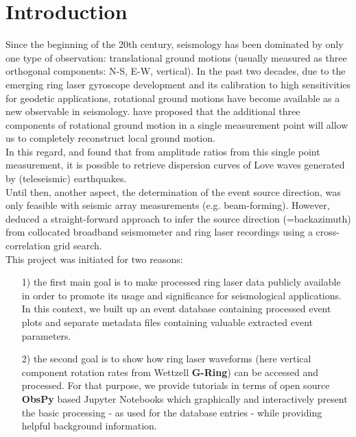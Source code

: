 \documentclass[12pt,reqno,letter]{article} %
\begin{document}
\section{Introduction}
Since the beginning of the 20th century, seismology has been dominated by only one type of observation: translational ground motions (usually measured as three orthogonal components: N-S, E-W, vertical). In the past two decades, due to the emerging ring laser gyroscope development and its calibration to high sensitivities \citep{Stedman1995,Stedman1997,Schreiber2003, Schreiber2004} for geodetic applications, rotational ground motions have become available as a new observable in seismology. \cite{AkiRichards2002} have proposed that the additional three components of rotational ground motion in a single measurement point will allow us to completely reconstruct local ground motion.\\ 
In this regard, \cite{Igel2005} and \cite{Kurrle2010} found that from amplitude ratios from this single point measurement, it is possible to retrieve dispersion curves of Love waves generated by (teleseismic) earthquakes.\\
Until then, another aspect, the determination of the event source direction, was only feasible with seismic array measurements (e.g. beam-forming). However, \cite{Igel2007} deduced a straight-forward approach to infer the source direction (=backazimuth) from  collocated broadband seismometer and ring laser recordings using a cross-correlation grid search.\\
This project was initiated for two reasons:
\begin{itemize}
\item[1)] the first main goal is to make processed ring laser data publicly available in order to promote its usage and significance for seismological applications. In this context, we built up an event database containing processed event plots and separate metadata files containing valuable extracted event parameters.
\item[2)] the second goal is to show how ring laser waveforms (here vertical component rotation rates from Wettzell \textbf{G-Ring}) can be accessed and processed. For that purpose, we provide tutorials in terms of open source \textbf{ObsPy} \citep{Megies2011,Krischer2015} based Jupyter Notebooks \citep{Perez2007} which graphically and interactively present the basic processing - as used for the database entries - while providing helpful background information.
\end{itemize}
\noindent
\end{document}
